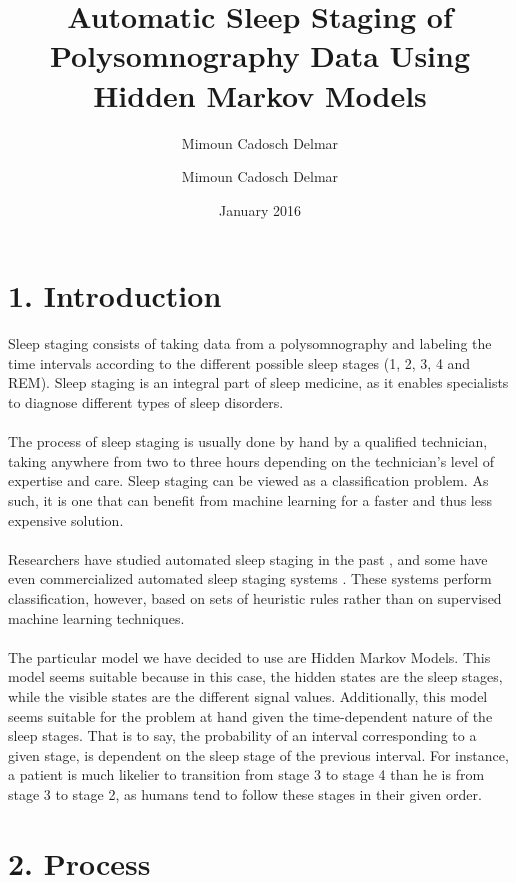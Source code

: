 \documentclass[10pt,a4paper]{report}
\author{Mimoun Cadosch Delmar }
\begin{document}
\title{Automatic Sleep Staging of Polysomnography Data Using Hidden Markov Models}
\author{Mimoun Cadosch Delmar}
\date{January 2016}

\maketitle


\section*{ 1. Introduction}

Sleep staging consists of taking data from a polysomnography and labeling the time intervals according to the different possible sleep stages (1, 2, 3, 4 and REM). Sleep staging is an integral part of sleep medicine, as it enables specialists to diagnose different types of sleep disorders. 
\\\\
The process of sleep staging is usually done by hand by a qualified technician, taking anywhere from two to three hours depending on the technician’s level of expertise and care. Sleep staging can be viewed as a classification problem. As such, it is one that can benefit from machine learning for a faster and thus less expensive solution. 
\\\\
Researchers have studied automated sleep staging in the past \cite{malhotra}, and some have even commercialized automated sleep staging systems \cite{michele}. These systems perform classification, however, based on sets of heuristic rules rather than on supervised machine learning techniques.
\\\\
The particular model we have decided to use are Hidden Markov Models. This model seems suitable because in this case, the hidden states are the sleep stages, while the visible states are the different signal values. Additionally, this model seems suitable for the problem at hand given the time-dependent nature of the sleep stages. That is to say, the probability of an interval corresponding to a given stage, is dependent on the sleep stage of the previous interval. For instance, a patient is much likelier to transition from stage 3 to stage 4 than he is from stage 3 to stage 2, as humans tend to follow these stages in their given order.

\section*{2. Process}
\end{document}

